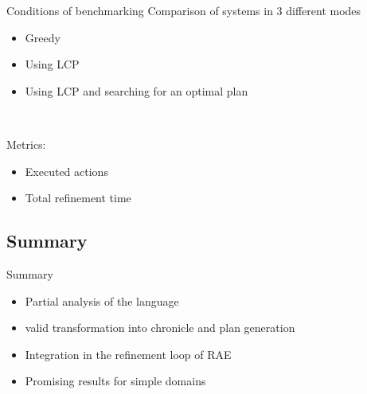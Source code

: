 \begin{frame}{Conditions of benchmarking}
Comparison of systems in 3 different modes
    \begin{itemize}
        \item Greedy
        \item Using LCP
        \item Using LCP and searching for an optimal plan
    \end{itemize}

~

\pause
Metrics:
\begin{itemize}
    \item Executed actions
    \item Total refinement time
\end{itemize}
\end{frame}

\subsection{Summary}
\begin{frame}{Summary}
    \begin{itemize}
        \item Partial analysis of the language
        \item valid transformation into chronicle and plan generation
        \item Integration in the refinement loop of RAE
        \item Promising results for simple domains
    \end{itemize}
\end{frame}


